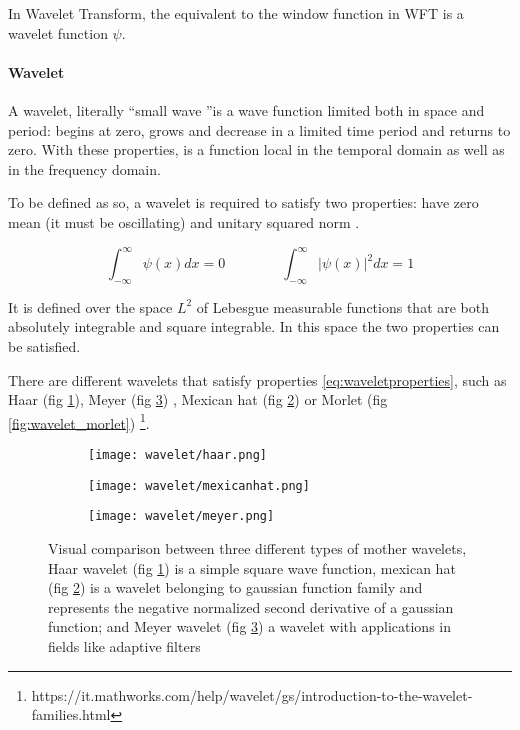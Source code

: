 \documentclass[11pt]{report}
\begin{document}
In Wavelet Transform, the equivalent to the window function in WFT is a wavelet function $\psi$.

\paragraph{Wavelet} \hfill

A wavelet, literally \textquotedblleft small wave \textquotedblright is a wave function limited both in space and period: begins at zero, grows and decrease in a limited time period and returns to zero. With these properties, is a function local in the temporal domain as well as in the frequency domain.

To be defined as so, a wavelet is required to satisfy two properties: have zero mean (it must be oscillating) and unitary squared norm \cite{percival-2013}.

\begin{equation}\label{eq:waveletproperties}
\int_{-\infty}^{\infty}\psi(x)dx = 0 \qquad \qquad  \int_{-\infty}^{\infty} |\psi(x)|^2 dx = 1
\end{equation}

It is defined over the space $L^2$ of Lebesgue measurable functions that are both absolutely integrable and square integrable. In this space the two properties can be satisfied.

There are different wavelets that satisfy properties \ref{eq:waveletproperties}, such as Haar (fig \ref{fig:wavelet_haar}), Meyer (fig \ref{fig:wavelet_meyer}) \cite{dabauchies-1992}, Mexican hat (fig \ref{fig:wavelet_mexicanhat}) or Morlet (fig \ref{fig:wavelet_morlet}) \footnote{https://it.mathworks.com/help/wavelet/gs/introduction-to-the-wavelet-families.html}.



\begin{figure}
\begin{subfigure}{0.3\textwidth}
\texttt{[image: wavelet/haar.png]}
\caption{}
\label{fig:wavelet_haar}
\end{subfigure}
\begin{subfigure}{0.3\textwidth}
\texttt{[image: wavelet/mexicanhat.png]}
\caption{}
\label{fig:wavelet_mexicanhat}
\end{subfigure}
\begin{subfigure}{0.3\textwidth}
\texttt{[image: wavelet/meyer.png]}
\caption{}
\label{fig:wavelet_meyer}
\end{subfigure}
\caption{Visual comparison between three different types of mother wavelets, Haar wavelet (fig \ref{fig:wavelet_haar}) is a simple square wave function, mexican hat (fig \ref{fig:wavelet_mexicanhat}) is a wavelet belonging to gaussian function family and represents the negative normalized second derivative of a gaussian function; and Meyer wavelet (fig \ref{fig:wavelet_meyer}) a wavelet with applications in fields like adaptive filters}
\label{fig:different_wavelets}
\end{figure}
\end{document}
